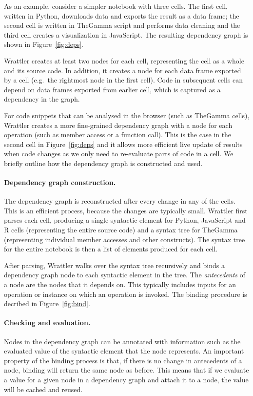\documentclass[sigplan]{acmart}\settopmatter{printfolios=true,printccs=false,printacmref=false}
\begin{document}
As an example, consider a simpler notebook with three cells. The first cell, written in Python,
downloads data and exports the result as a data frame; the second cell is written in TheGamma script
and performs data cleaning and the third cell creates a visualization in JavaScript. The
resulting dependency graph is shown in Figure~\ref{fig:deps}.

Wrattler creates at least two nodes for each cell, representing the cell as a whole and its source
code. In addition, it creates a node for each data frame exported by a cell (e.g.~the rightmost
node in the first cell). Code in subsequent cells can depend on data frames exported from earlier
cell, which is captured as a dependency in the graph. 

For code snippets that can be analysed in 
the browser (such as TheGamma cells), Wrattler creates a more fine-grained dependency graph with
a node for each operation (such as member access or a function call). This is the case in the 
second cell in Figure~\ref{fig:deps} and it allows more efficient live update of results when 
code changes as we only need to re-evaluate parts of code in a cell. We briefly outline how the
dependency graph is constructed and used.

\paragraph{Dependency graph construction.} 
The dependency graph is reconstructed after every change in any of the cells. This is an efficient
process, because the changes are typically small. Wrattler first parses each cell, producing a
single syntactic element for Python, JavaScript and R cells (representing the entire source code)
and a syntax tree for TheGamma (representing individual member accesses and other constructs).
The syntax tree for the entire notebook is then a list of elements produced for each cell.
 
After parsing, Wrattler walks over the syntax tree recursively and binds a dependency graph node
to each syntactic element in the tree. The \emph{antecedents} of a node are the nodes that it
depends on. This typically includes inputs for an operation or instance on which an operation
is invoked. The binding procedure is decribed in Figure~\ref{fig:bind}. 

\paragraph{Checking and evaluation.} 
Nodes in the dependency graph can be annotated with information such as the evaluated value
of the syntactic element that the node represents. An important property of the binding process
is that, if there is no change in antecedents of a node, binding will return the same node
as before. This means that if we evaluate a value for a given node in a dependency graph and
attach it to a node, the value will be cached and reused. 
\end{document}
